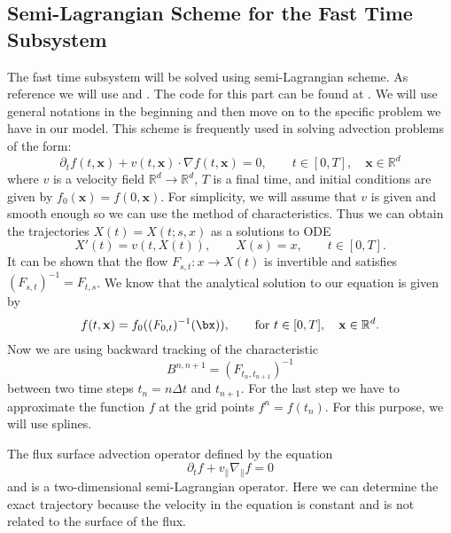 \subsection{Semi-Lagrangian Scheme for the Fast Time Subsystem}

The fast time subsystem will be solved using semi-Lagrangian scheme. As reference we will use \cite{campospinto} and \cite{emily}.
The code for this part can be found at \cite{pygyro_code}. We will use general notations in the beginning and then move on to the specific problem we have in our model. This scheme is frequently used in solving advection problems of the form:
\begin{equation}
    \partial_t f(t,\mathbf{x})+v(t,\mathbf{x})\cdot \nabla f(t,\mathbf{x})=0, \qquad t\in[0,T], \quad \mathbf{x}\in\mathbb{R}^d
\end{equation}
where $v$ is a velocity field $\mathbb{R}^d\longrightarrow\mathbb{R}^d$, $T$ is a final time, and initial conditions are given by $f_0(\mathbf{x})=f(0,\mathbf{x})$. For simplicity, we will assume that $v$ is given and smooth enough so we can use the method of characteristics. Thus we can obtain the trajectories $X(t)=X(t;s,x)$ as a solutions to ODE
\begin{equation}
    X'(t)=v(t,X(t)), \qquad X(s)=x, \qquad t\in[0,T].
\end{equation}
It can be shown that the flow $F_{s,t}:x\longrightarrow X(t)$ is invertible and satisfies $(F_{s,t})^{-1}=F_{t,s}$. We know that the analytical solution to our equation is given by
\begin{equation}
    f(t,\mathbf{x})=f_0((F_{0,t})^{-1}(\bx)),\qquad \text{for } t\in[0,T], \quad \mathbf{x}\in\mathbb{R}^d.
\end{equation}
Now we are using backward tracking of the characteristic
\begin{equation}
    B^{n,n+1}=(F_{t_n,t_{n+1}})^{-1}
\end{equation}
between two time steps $t_n=n\Delta t$ and $t_{n+1}$. For the last step we have to approximate the function $f$ at the grid points $f^n=f(t_n)$. For this purpose, we will use splines.

The flux surface advection operator defined by the equation
\begin{equation}
 \partial_t f + v_\parallel \nabla_\parallel f = 0
\end{equation}
and is a two-dimensional semi-Lagrangian operator. Here we can determine the exact trajectory because the velocity in the equation is constant and is not related to the surface of the flux.

